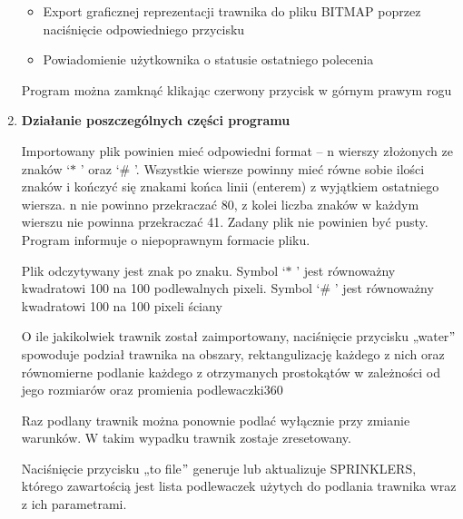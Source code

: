 \documentclass[12pt]{article}
\renewcommand{\_}{\kern-1.5pt\textunderscore\kern-1.5pt}
\begin{document}
\begin{enumerate}
\begin{itemize}
	\item Export graficznej reprezentacji trawnika do pliku BITMAP poprzez naciśnięcie odpowiedniego przycisku\par

	\item Powiadomienie użytkownika o statusie ostatniego polecenia
\end{itemize}\par

Program można zamknąć klikając czerwony przycisk w górnym prawym rogu\par


\vspace{\baselineskip}

\vspace{\baselineskip}

\vspace{\baselineskip}
	\item \textbf{Działanie poszczególnych części programu}\par

Importowany plik powinien mieć odpowiedni format – n wierszy złożonych ze znaków ‘$\ast$ ’ oraz ‘$\#$ ’. Wszystkie wiersze powinny mieć równe sobie ilości znaków i kończyć się znakami końca linii (enterem) z wyjątkiem ostatniego wiersza. n nie powinno przekraczać 80, z kolei liczba znaków w każdym wierszu nie powinna przekraczać 41. Zadany plik nie powinien być pusty. Program informuje o niepoprawnym formacie pliku.\par

Plik odczytywany jest znak po znaku. Symbol ‘$\ast$ ’ jest równoważny kwadratowi 100 na 100 podlewalnych pixeli. Symbol ‘$\#$ ’ jest równoważny kwadratowi 100 na 100 pixeli ściany\par

O ile jakikolwiek trawnik został zaimportowany, naciśnięcie przycisku „water$"$  spowoduje podział trawnika na obszary, rektangulizację każdego z nich oraz równomierne podlanie każdego z otrzymanych prostokątów w zależności od jego rozmiarów oraz promienia podlewaczki360\par

Raz podlany trawnik można ponownie podlać wyłącznie przy zmianie warunków. W takim wypadku trawnik zostaje zresetowany.\par

Naciśnięcie przycisku „to file$"$  generuje lub aktualizuje SPRINKLERS, którego zawartością jest lista podlewaczek użytych do podlania trawnika wraz z ich parametrami.\par


\end{enumerate}
\end{document}
